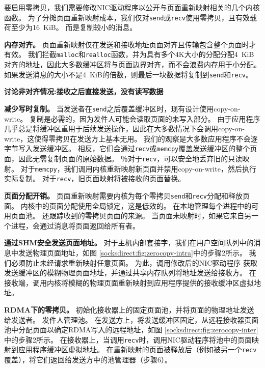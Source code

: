 

要启用零拷贝，我们需要修改NIC驱动程序以公开与页面重新映射相关的几个内核函数。
为了分摊页面重新映射成本，我们仅对\texttt {send}或\texttt {recv}使用零拷贝，且有效载荷至少为16~KiB。
而是复制较小的消息。

\textbf {内存对齐。}
页面重新映射仅在发送和接收地址页面对齐且传输包含整个页面时才有效。
我们拦截\texttt {malloc}和\texttt {realloc}函数，并为具有多个4K大小的分配分配4~KiB对齐的地址，因此大多数缓冲区将与页面边界对齐，而不会浪费内存用于小分配。
如果发送消息的大小不是4~KiB的倍数，则最后一块数据将复制到\texttt {send}和\texttt {recv}。

\textbf{讨论非对齐情况:接收之后直接发送，没有读写数据}



\textbf{减少写时复制。}
当发送者在\texttt {send}之后覆盖缓冲区时，现有设计使用copy-on-write。
复制是必需的，因为发件人可能会读取页面的未写入部分。
由于应用程序几乎总是将缓冲区重用于后续发送操作，因此在大多数情况下会调用copy-on-write，这使得零拷贝在发送方上基本无用。
我们的观察是大多数应用程序不会逐字节写入发送缓冲区。 相反，它们会通过\texttt {recv}或\texttt {memcpy}覆盖发送缓冲区的整个页面，因此无需复制页面的原始数据。
％对于\texttt {recv}，可以安全地丢弃旧的只读映射。
对于\texttt {memcpy}，我们调用内核重新映射新页面并禁用copy-on-write，然后执行实际复制。
对于\texttt {recv}，旧页面映射将被接收的页面替换。


\textbf {页面分配开销。}
页面重新映射需要内核为每个零拷贝\texttt {send}和\texttt {recv}分配和释放页面。
内核中的页面分配使用全局锁定，这是低效的。 \libipc {}在本地管理每个进程中的可用页面池。
\libipc {}还跟踪收到的零拷贝页面的来源。
当页面未映射时，如果它来自另一个进程，\libipc {}会通过消息将页面返回给所有者。

\textbf {通过SHM安全发送页面地址。}
对于主机内部套接字，我们在用户空间队列中的消息中发送物理页面地址，如图 \ref {socksdirect:fig:zerocopy-intra}中的步骤2所示。
我们必须防止未经请求重新映射任意页面。
为此，\libipc {}调用修改后的NIC驱动程序
获取发送缓冲区的模糊物理页面地址，并通过共享内存队列将地址发送给接收方。
在接收端，\libipc {}调用内核将模糊的物理页面重新映射到应用程序提供的接收缓冲区虚拟地址。

\textbf {RDMA下的零拷贝。}
\libipc {}初始化接收器上的固定页面池，并将页面的物理地址发送给发送者。
发件人管理池。
在发送方上，\libipc {}将发送缓冲区固定，从远程接收器页面池中分配页面以确定RDMA写入的远程地址，如图 \ref {socksdirect:fig:zerocopy-inter}中的步骤2所示。
在接收器上，当调用\texttt {recv}时，\libipc 调用NIC驱动程序将池中的页面映射到应用程序缓冲区虚拟地址。
在重新映射的页面被释放后（例如被另一个\texttt {recv}覆盖），\libipc {}将它们返回给发送方中的池管理器（步骤6）。

